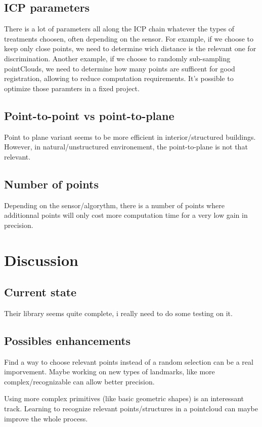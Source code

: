 \documentclass[twoside,twocolumn]{article}
\begin{document}
\subsection{ICP parameters}
There is a lot of parameters all along the ICP chain whatever the types of treatments choosen, often depending on the sensor.
For example, if we choose to keep only close points, we need to determine wich distance is the relevant one for discrimination.
Another example, if we choose to randomly sub-sampling pointClouds, we need to determine how many points are sufficent for good registration, allowing to reduce computation requirements.
It's possible to optimize those paramters in a fixed project.
\subsection{Point-to-point vs point-to-plane}
Point to plane variant seems to be more efficient in interior/structured buildings. However, in natural/unstructured environement, the point-to-plane is not that relevant.

\subsection{Number of points}
Depending on the sensor/algorythm, there is a number of points where additionnal points will only cost more computation time for a very low gain in precision.

\section{Discussion}
\subsection{Current state}
Their library seems quite complete, i really need to do some testing on it.
\subsection{Possibles enhancements}
Find a way to choose relevant points instead of a random selection can be a real imporvement.
Maybe working on new types of landmarks, like more complex/recognizable can allow better precision.

Using more complex primitives (like basic geometric shapes) is an interessant track.
Learning to recognize relevant points/structures in a pointcloud can maybe improve the whole process.

\printbibliography
\end{document}
